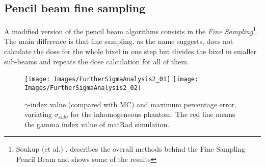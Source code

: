 \documentclass[12pt, a4paper, twoside]{book}
\begin{document}
\subsection{Pencil beam fine sampling}
A modified version of the pencil beam algorithms consists in the \emph{Fine Sampling}\footnote{Soukup (et al.) \cite{souk:pba}, describes the overall methods behind the Fine Sampling Pencil Beam and shows some of the results}.
The main difference is that fine sampling, as the name suggests, does not calculate the dose for the whole bixel in one step but divides the bixel in smaller sub-beams and repeats the dose calculation for all of them. 
\begin{figure}[t]
{\texttt{[image: Images/FurtherSigmaAnalysis2\_01]}}
{\texttt{[image: Images/FurtherSigmaAnalysis2\_02]}}
\caption{$\gamma$-index value (compared with MC) and maximum percentage error, variating $\sigma_{sub}$, for the inhomogeneous phantom. The red line means the gamma index value of matRad simulation.}
\label{fig:sigsub}
\end{figure}
\end{document}
